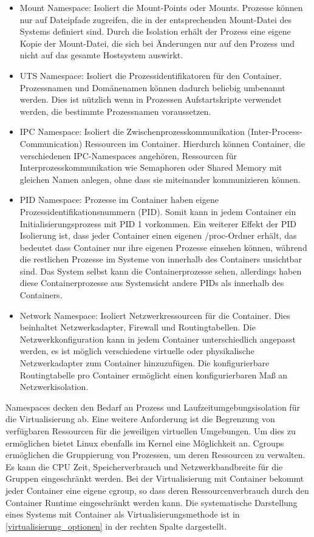 \begin{itemize}
	\item Mount Namespace: Isoliert die Mount-Points oder Mounts. Prozesse können nur auf Dateipfade zugreifen, die in der entsprechenden Mount-Datei des Systems definiert sind. Durch die Isolation erhält der Prozess eine eigene Kopie der Mount-Datei, die sich bei Änderungen nur auf den Prozess und nicht auf das gesamte Hostsystem auswirkt.
	\item UTS Namespace: Isoliert die Prozessidentifikatoren für den Container. Prozessnamen und Domänenamen können dadurch beliebig umbenannt werden. Dies ist nützlich wenn in Prozessen Aufstartskripte verwendet werden, die bestimmte Prozessnamen voraussetzen.
	\item IPC Namespace: Isoliert die Zwischenprozesskommunikation (Inter-Process-Communication) Ressourcen im Container. Hierdurch können Container, die verschiedenen IPC-Namespaces angehören, Ressourcen für Interprozesskommunikation wie Semaphoren oder Shared Memory mit gleichen Namen anlegen, ohne dass sie miteinander kommunizieren können.
	\item PID Namespace: Prozesse im Container haben eigene Prozessidentifikationsnummern (\gls{PID}). Somit kann in jedem Container ein Initialisierungsprozess mit \gls{PID} 1 vorkommen. Ein weiterer Effekt der \gls{PID} Isolierung ist, dass jeder Container einen eigenen /proc-Ordner erhält, das bedeutet dass Container nur ihre eigenen Prozesse einsehen können, während die restlichen Prozesse im Systeme von innerhalb des Containers unsichtbar sind. Das System selbst kann die Containerprozesse sehen, allerdings haben diese Containerprozesse aus Systemsicht andere \gls{PID}s als innerhalb des Containers.
	\item Network Namespace: Isoliert Netzwerkressourcen für die Container. Dies beinhaltet Netzwerkadapter, Firewall und Routingtabellen. Die Netzwerkkonfiguration kann in jedem Container unterschiedlich angepasst werden, es ist möglich verschiedene virtuelle oder physikalische Netzwerkadapter zum Container hinzuzufügen. Die konfigurierbare Routingtabelle pro Container ermöglicht einen konfigurierbaren Maß an Netzwerkisolation.
\end{itemize} 

Namespaces decken den Bedarf an Prozess und Laufzeitumgebungsisolation für die Virtualisierung ab. Eine weitere Anforderung ist die Begrenzung von verfügbaren Ressourcen für die jeweiligen virtuellen Umgebungen. Um dies zu ermöglichen bietet Linux ebenfalls im Kernel eine Möglichkeit an. Cgroups ermöglichen die Gruppierung von Prozessen, um deren Ressourcen zu verwalten. Es kann die CPU Zeit, Speicherverbrauch und Netzwerkbandbreite für die Gruppen eingeschränkt werden. Bei der Virtualisierung mit Container bekommt jeder Container eine eigene cgroup, so dass deren Ressourcenverbrauch durch den Container Runtime eingeschränkt werden kann. \cite{Red_2024} 
Die systematische Darstellung eines Systems mit Container als Virtualisierungsmethode ist in \autoref{virtualisierung_optionen} in der rechten Spalte dargestellt. 

